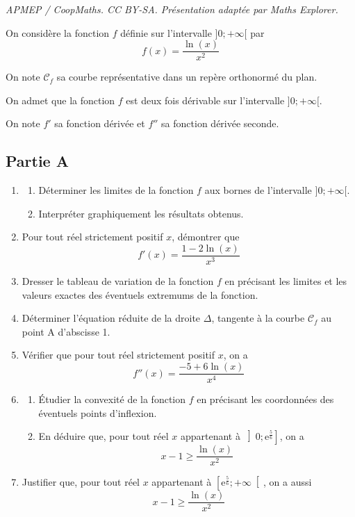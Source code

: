 \documentclass[10pt]{article}
\providecommand{\e}{{\mathrm{e}}}
\begin{document}
\noindent\textit{APMEP / CoopMaths. CC BY-SA. Présentation adaptée par Maths Explorer.}\par\medskip
On considère la fonction $f$ définie sur l'intervalle $] 0 ; +\infty[$ par \quad \[f(x)=\dfrac{\ln (x)}{x^{2}}\]
	
	On note $\mathcal{C}_{f}$ sa courbe représentative dans un repère orthonormé du plan.
	
	On admet que la fonction $f$ est deux fois dérivable sur l'intervalle $]0 ; +\infty[$.
	
	On note $f'$ sa fonction dérivée et $f''$ sa fonction dérivée seconde.
	
	\subsection*{Partie A}
	\begin{enumerate}
		\item \begin{enumerate}
			\item Déterminer les limites de la fonction $f$ aux bornes de l'intervalle $] 0;+\infty[$.
			
			\item Interpréter graphiquement les résultats obtenus.
		\end{enumerate}
		
		\item Pour tout réel strictement positif $x$, démontrer que \quad
		\[f'(x)=\dfrac{1-2 \ln (x)}{x^{3}}\]
		
		\item Dresser le tableau de variation de la fonction $f$ en précisant les limites et les valeurs exactes des éventuels extremums de la fonction.
		
		\item Déterminer l'équation réduite de la droite $\Delta$, tangente à la courbe $\mathcal{C}_{f}$ au point A d'abscisse 1.
		
		\item Vérifier que pour tout réel strictement positif $x$, on a \quad \[f''(x)=\dfrac{-5+6 \ln (x)}{x^{4}}\]
		
		\item \begin{enumerate}
			\item Étudier la convexité de la fonction $f$ en précisant les coordonnées des éventuels points d'inflexion.
			
			\item En déduire que, pour tout réel $x$ appartenant à $\left]0 ; \e^{\frac{5}{6}}\right]$, on a \quad
			\[x-1 \geqslant \dfrac{\ln (x)}{x^{2}}\]
		\end{enumerate}
		
		\item Justifier que, pour tout réel $x$ appartenant à $\left[\e^{\frac{5}{6}} ; +\infty\right[$, on a aussi
		\[x-1 \geqslant  \dfrac{\ln (x)}{x^{2}}\]
	\end{enumerate}
	
\end{document}
